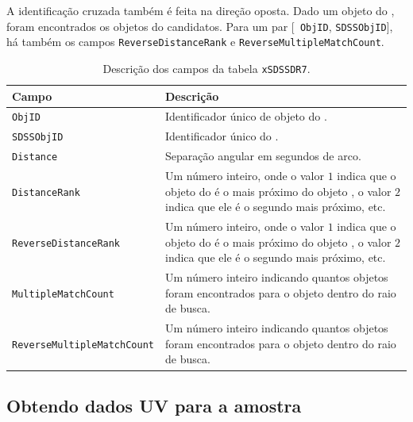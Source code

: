 A identificação cruzada também é feita na direção oposta. Dado um objeto do
\SDSS, foram encontrados os objetos do \galex candidatos. Para um par [{\tt
ObjID}, \texttt{SDSSObjID}], há também os campos \texttt{ReverseDistanceRank} e
{\tt ReverseMultipleMatchCount}.

\begin{table}
	\caption[Descrição dos campos da tabela \texttt{xSDSSDR7}.]
	{Descrição dos campos da tabela \texttt{xSDSSDR7}.}
	\begin{tabular}{l p{8cm}}
		Campo & Descrição\\
		\midrule
		\texttt{ObjID} &
		Identificador único de objeto do \galex.
		\\
		\texttt{SDSSObjID} &
		Identificador único do \SDSS.
		\\
		\texttt{Distance} &
		Separação angular em segundos de arco.
		\\
		\texttt{DistanceRank} &
		Um número inteiro, onde o valor $1$ indica que o objeto do \galex é o
		mais próximo do objeto \SDSS, o valor $2$ indica que ele é o segundo mais
		próximo, etc.
		\\
		\texttt{ReverseDistanceRank} &
		Um número inteiro, onde o valor $1$ indica que o objeto do \SDSS é o mais
		próximo do objeto \galex, o valor $2$ indica que ele é o segundo mais
		próximo, etc.
		\\
		\texttt{MultipleMatchCount} &
		Um número inteiro indicando quantos objetos \SDSS foram encontrados para o
		objeto \galex dentro do raio de busca.
		\\
		\texttt{ReverseMultipleMatchCount} &
		Um número inteiro indicando quantos objetos \galex foram encontrados para o
		objeto \SDSS dentro do raio de busca.
		\\
	\end{tabular}
	\label{tab:CamposXSDSSDR7}
\end{table}

\subsection{Obtendo dados UV para a amostra \STARLIGHT}

